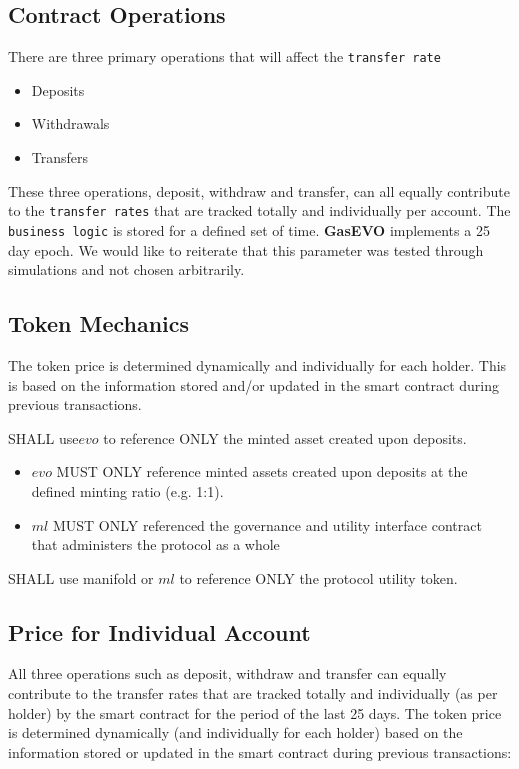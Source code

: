 \subsection{Contract Operations}

There are three primary operations that will affect the \texttt{transfer rate}

\begin{itemize}
  \item Deposits
  \item Withdrawals 
  \item Transfers
\end{itemize}


These three operations, deposit, withdraw and transfer,  can all equally contribute to
the \texttt{transfer rates} that are tracked totally and individually
per account. The \texttt{business logic} is stored for a defined set
of time. \textbf{GasEVO} implements a 25 day epoch. We would like to
reiterate that this parameter was tested through simulations and not
chosen arbitrarily. 

\subsection{Token Mechanics}
The token price is determined dynamically and individually for each holder. This is based on the
information stored and/or updated in the smart contract during
previous transactions. 


SHALL use$ evo$ to reference ONLY the minted asset created upon
deposits.
\linebreak

\begin{itemize}
    \item $evo$ MUST ONLY reference minted assets created upon deposits at the defined minting ratio (e.g. 1:1).
    \item $ml$ MUST ONLY referenced the governance and utility interface contract that administers the protocol as a whole
\end{itemize}

 SHALL use  manifold  or $ml$ to reference ONLY the protocol utility token.

\newpage
\subsection{Price for Individual Account} 
 All three operations such as deposit, withdraw and transfer can
 equally contribute to the transfer rates that are tracked totally and
 individually (as per holder)
by the smart contract for the period of the last 25 days. The token
price is determined dynamically (and individually for each holder)
based on the information stored or updated in the smart contract
during previous transactions:

